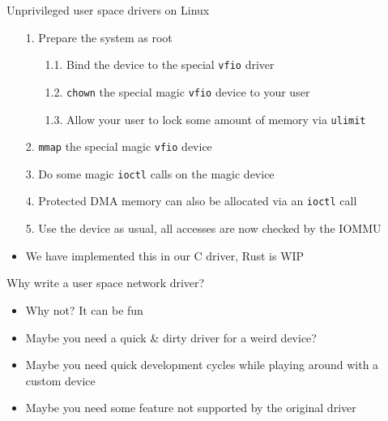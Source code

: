 \documentclass[NET,english,aspectratio=169,notitleframe]{tumbeamer}
\begin{document}
\begin{frame}{Unprivileged user space drivers on Linux}
\begin{itemize}
\item[1.] Prepare the system as root
\begin{itemize}
\item[1.1.] Bind the device to the special \texttt{vfio} driver
\item[1.2.] \texttt{chown} the special magic \texttt{vfio} device to your user
\item[1.3.] Allow your user to lock some amount of memory via \texttt{ulimit}
\end{itemize}
\pause
\item[2.] \texttt{mmap} the special magic \texttt{vfio} device
\item[3.] Do some magic \texttt{ioctl} calls on the magic device
\item[4.] Protected DMA memory can also be allocated via an \texttt{ioctl} call
\item[5.] Use the device as usual, all accesses are now checked by the IOMMU
\vspace{1em}
\pause
\item We have implemented this in our C driver, Rust is WIP
\end{itemize}
\end{frame}




\begin{frame}{Why write a user space network driver?}
\begin{itemize}
\item Why not? It can be fun
\item Maybe you need a quick \& dirty driver for a weird device?
\item Maybe you need quick development cycles while playing around with a custom device
\item Maybe you need some feature not supported by the original driver
\end{itemize}
\end{frame}
\end{document}
